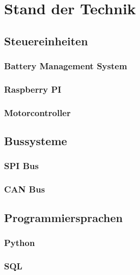 \chapter{Stand der Technik}

\section{Steuereinheiten}
\subsection{Battery Management System}
\subsection{Raspberry PI}
\subsection{Motorcontroller}

\section{Bussysteme}
\subsection{SPI Bus}
\subsection{CAN Bus}

\section{Programmiersprachen}
\subsection{Python}
\subsection{SQL}
